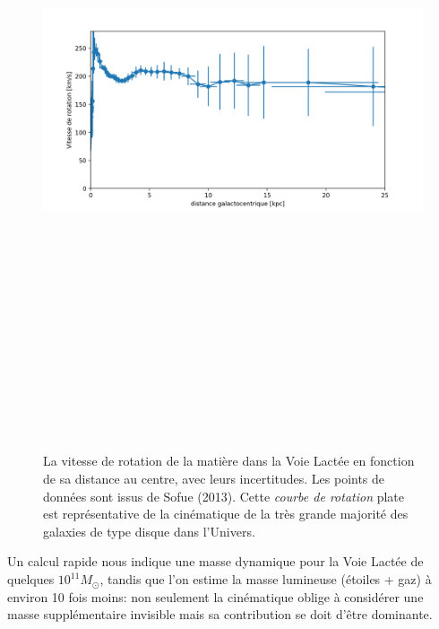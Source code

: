 \begin{figure}[htbp]
	\centering
		\includegraphics[height=20cm]{figs/rocurveMW.png}
	\caption[La vitesse de rotation de la matière dans la Voie Lactée]{La vitesse de rotation de la matière dans la Voie Lactée en fonction de sa distance au centre, avec leurs incertitudes. Les points de données sont issus de Sofue (2013). Cette \textit{courbe de rotation} plate est représentative de la cinématique de la très grande majorité des galaxies de type disque dans l'Univers.} 
	\label{f:rotcurve}
\end{figure}

Un calcul rapide nous indique une masse dynamique pour la Voie Lactée de quelques $10^{11} M_\odot$, tandis que l'on estime la masse lumineuse (étoiles + gaz) à environ 10 fois moins: non seulement la cinématique oblige à considérer une masse supplémentaire invisible mais sa contribution se doit d'être dominante.

